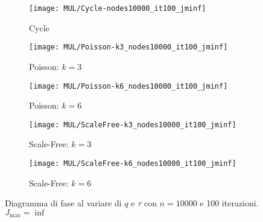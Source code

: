     \begin{figure}[H]
        \begin{minipage}{\linewidth}
            \centering
            \begin{minipage}{0.45\linewidth}
                \begin{figure}
                    \texttt{[image: MUL/Cycle-nodes10000\_it100\_jminf]}\caption{Cycle}
                    \label{fig:mul_cycle_nodes_10000}
                \end{figure}
            \end{minipage}
            \hspace{0.05\linewidth}
            \begin{minipage}{0.45\linewidth}
                \begin{figure}
                    \texttt{[image: MUL/Poisson-k3\_nodes10000\_it100\_jminf]}\caption{Poisson: $k=3$}
                    \label{fig:mul_poisson_k_3_nodes_10000}
                \end{figure}
            \end{minipage}
            \begin{minipage}{0.45\linewidth}
                \begin{figure}
                    \texttt{[image: MUL/Poisson-k6\_nodes10000\_it100\_jminf]}\caption{Poisson: $k=6$}
                    \label{fig:mul_poisson_k_6_nodes_10000}
                \end{figure}
            \end{minipage}
            \hspace{0.05\linewidth}
            \begin{minipage}{0.45\linewidth}
                \begin{figure}
                    \texttt{[image: MUL/ScaleFree-k3\_nodes10000\_it100\_jminf]}\caption{Scale-Free: $k=3$}
                    \label{fig:mul_scale_free_k_3_nodes_10000}
                \end{figure}
            \end{minipage}
            \begin{minipage}{0.45\linewidth}
                \begin{figure}
                    \texttt{[image: MUL/ScaleFree-k6\_nodes10000\_it100\_jminf]}\caption{Scale-Free: $k=6$}
                    \label{fig:mul_scale_free_k_6_nodes_10000}
                \end{figure}
            \end{minipage}
            \caption{Diagramma di fase al variare di $q$ e $\tau$ con $n=10000$ e 100 iterazioni. $J_{\max}=\inf$}
        \end{minipage}
    \end{figure}

